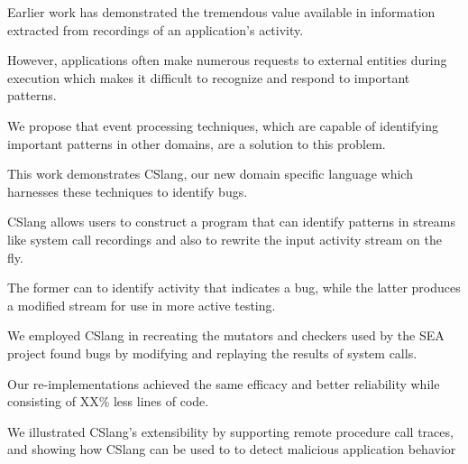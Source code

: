 Earlier work has demonstrated
the tremendous value
available in
information extracted
from recordings
of an application's activity.

However, applications often make numerous requests
to external entities during execution
which makes it difficult
to recognize and respond to important patterns.

We propose that event processing techniques,
which are capable
of identifying important patterns
in other domains,
are a solution
to this problem.

This work demonstrates
CSlang,
our new domain specific language
which harnesses
these techniques
to identify bugs.

CSlang allows users
to construct a program that can identify
patterns in streams like
system call recordings
and also to rewrite the input activity stream on the fly.

The former can
to identify activity
that indicates a bug,
while the latter produces a modified stream
for use in more active testing.

We employed CSlang
in recreating the mutators and checkers
used by
the SEA project
found bugs
by modifying and replaying the results of
system calls.

Our re-implementations
achieved the same efficacy
and better reliability
while consisting of XX\% less lines of code.

We illustrated CSlang's extensibility
by supporting remote procedure call traces,
and showing how CSlang can be used to
to detect malicious application behavior

